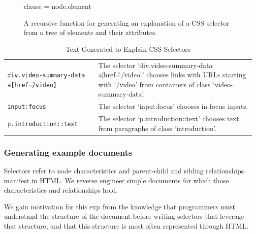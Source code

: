 \begin{figure}
\begin{algorithmic}
\scriptsize

        clause = node.element
    \Else{}
    \EndIf{}
    \EndIf{}
    \EndIf{}
\EndFunction{}

\end{algorithmic}
\caption{A recursive function for generating an explanation of a CSS selector from a tree of elements and their attributes.}
\label{alg:css_traversal}
\end{figure}


\begin{table}[t]
\caption{Text Generated to Explain CSS Selectors}
\label{tab:css_descriptions}
\centering
\begin{tabular}{ST}
\toprule
{} &  \\
\midrule
\texttt{div.video-summary-data a[href\^=/video]} & The selector `div.video-summary-data a[href\^=/video]' chooses links with URLs starting with `/video' from containers of class `video-summary-data'. \\ \midrule
\texttt{input:focus} & The selector `input:focus' chooses in-focus inputs. \\ \midrule
\texttt{p.introduction::text} & The selector `p.introduction::text' chooses text from paragraphs of class `introduction'. \\ \bottomrule
\end{tabular}
\end{table}

\subsubsection{Generating example documents}

\begin{changes}
Selectors refer to node characteristics and parent-child and sibling relationships manifest in HTML\@.
We reverse engineer simple documents for which those characteristics and relationships hold.
\end{changes}
{}
We gain motivation for this \gls{exp} from the knowledge that programmers must understand the structure of the document before writing selectors that leverage that structure, and that this structure is most often represented through HTML\@.
\fi

